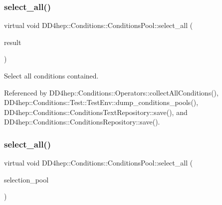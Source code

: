 \subsubsection{\texorpdfstring{select\+\_\+all()}{select\_all()}\hspace{0.1cm}{\footnotesize\ttfamily [1/2]}}
{\footnotesize\ttfamily virtual void D\+D4hep\+::\+Conditions\+::\+Conditions\+Pool\+::select\+\_\+all (\begin{DoxyParamCaption}\item[{\hyperlink{namespace_d_d4hep_1_1_conditions_ae765f0140a33973a430280f02b6062f4}{Range\+Conditions} \&}]{result }\end{DoxyParamCaption})\hspace{0.3cm}{\ttfamily [pure virtual]}}



Select all conditions contained. 



Referenced by D\+D4hep\+::\+Conditions\+::\+Operators\+::collect\+All\+Conditions(), D\+D4hep\+::\+Conditions\+::\+Test\+::\+Test\+Env\+::dump\+\_\+conditions\+\_\+pools(), D\+D4hep\+::\+Conditions\+::\+Conditions\+Text\+Repository\+::save(), and D\+D4hep\+::\+Conditions\+::\+Conditions\+Repository\+::save().

\hypertarget{class_d_d4hep_1_1_conditions_1_1_conditions_pool_ac500caf2c66d0bad8523d83d569f969c}{}\label{class_d_d4hep_1_1_conditions_1_1_conditions_pool_ac500caf2c66d0bad8523d83d569f969c} 
\subsubsection{\texorpdfstring{select\+\_\+all()}{select\_all()}\hspace{0.1cm}{\footnotesize\ttfamily [2/2]}}
{\footnotesize\ttfamily virtual void D\+D4hep\+::\+Conditions\+::\+Conditions\+Pool\+::select\+\_\+all (\begin{DoxyParamCaption}\item[{\hyperlink{class_d_d4hep_1_1_conditions_1_1_conditions_pool}{Conditions\+Pool} \&}]{selection\+\_\+pool }\end{DoxyParamCaption})\hspace{0.3cm}{\ttfamily [pure virtual]}}



